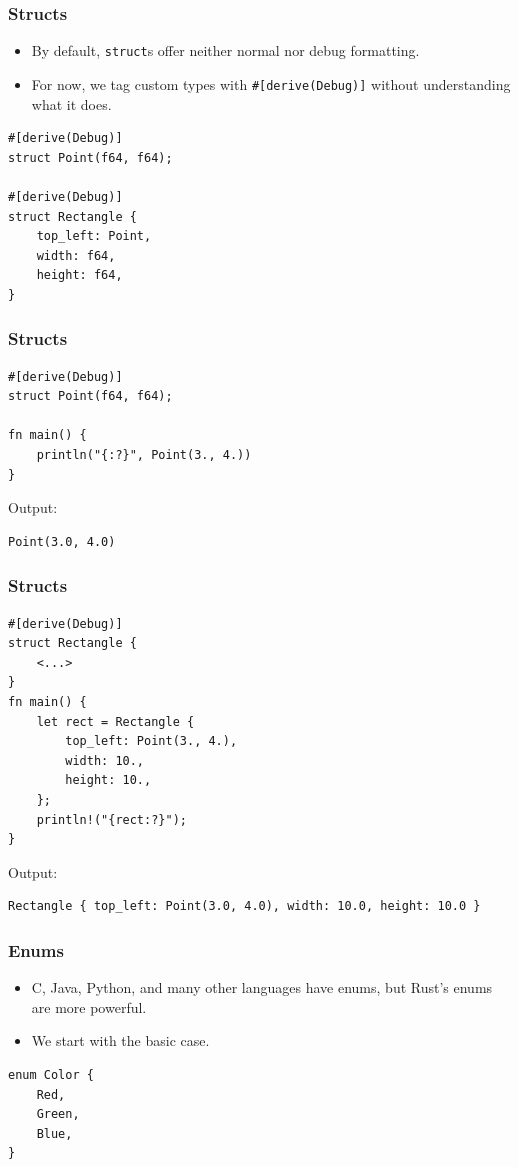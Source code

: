 \begin{frame}[fragile]
    \frametitle{Structs}
    \begin{itemize}
        \item By default, \texttt{struct}s offer neither normal nor debug formatting.
        \item For now, we tag custom types with \texttt{\#[derive(Debug)]} without understanding what it does.
    \end{itemize}
    \pause
    \vfill
    \begin{verbatim}
#[derive(Debug)]
struct Point(f64, f64);

#[derive(Debug)]
struct Rectangle {
    top_left: Point,
    width: f64,
    height: f64,
}
    \end{verbatim}
\end{frame}

\begin{frame}[fragile]
    \frametitle{Structs}
    \begin{verbatim}
#[derive(Debug)]
struct Point(f64, f64);

fn main() {
    println("{:?}", Point(3., 4.))
}
    \end{verbatim}
    \pause
    \vfill
    Output:
    \begin{verbatim}
Point(3.0, 4.0)
    \end{verbatim}
\end{frame}

\begin{frame}[fragile]
    \frametitle{Structs}
    \begin{verbatim}
#[derive(Debug)]
struct Rectangle {
    <...>
}
fn main() {
    let rect = Rectangle {
        top_left: Point(3., 4.),
        width: 10.,
        height: 10.,
    };
    println!("{rect:?}");
}
    \end{verbatim}
    \pause
    \vfill
    Output:
    \begin{verbatim}
Rectangle { top_left: Point(3.0, 4.0), width: 10.0, height: 10.0 }
    \end{verbatim}
\end{frame}

\begin{frame}[fragile]
    \frametitle{Enums}
    \begin{itemize}
        \item C, Java, Python, and many other languages have enums, but Rust's enums are more powerful.
        \item We start with the basic case.
    \end{itemize}
    \pause
    \vfill
    \begin{verbatim}
enum Color {
    Red,
    Green,
    Blue,
}
    \end{verbatim}
\end{frame}

